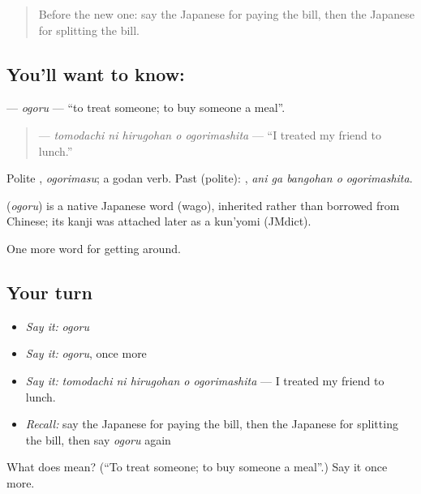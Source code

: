 \begin{quote}
Before the new one: say the Japanese for paying the bill, then the Japanese for splitting the bill.
\end{quote}

\subsection*{You'll want to know: }
\textbf{} — \emph{ogoru} — \textquotedblleft{}to treat someone; to buy someone a meal\textquotedblright{}.

\begin{quote}
\textbf{  } — \emph{tomodachi ni hirugohan o ogorimashita} — \textquotedblleft{}I treated my friend to lunch.\textquotedblright{}
\end{quote}

Polite \textbf{}, \emph{ogorimasu}; a godan verb. Past (polite): \textbf{  }, \emph{ani ga bangohan o ogorimashita}.

\begin{cousinweb}
\textbf{} (\emph{ogoru}) is a native Japanese word (wago), inherited rather than borrowed from Chinese; its kanji was attached later as a kun'yomi (JMdict).
\end{cousinweb}

\begin{grammarlens}[title={What you've built}]
One more word for getting around.
\end{grammarlens}

\subsection*{Your turn}
\begin{itemize}
\raggedright
  \item \emph{Say it:} \emph{ogoru}
  \item \emph{Say it:} \emph{ogoru}, once more
  \item \emph{Say it:} \emph{tomodachi ni hirugohan o ogorimashita} — I treated my friend to lunch.
  \item \emph{Recall:} say the Japanese for paying the bill, then the Japanese for splitting the bill, then say \emph{ogoru} again
\end{itemize}

\begin{tcolorbox}[breakable,colback=teal!4,colframe=teal!35!black,title={Before you move on}]
What does  mean? (\textquotedblleft{}To treat someone; to buy someone a meal\textquotedblright{}.) Say it once more.
\end{tcolorbox}

